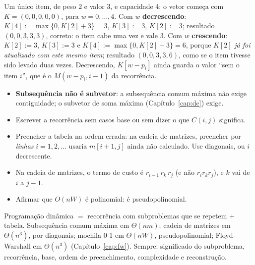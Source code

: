 \begin{exemplo}\label{ex:vetorunico}
Um único item, de peso 2 e valor 3, e capacidade 4; o vetor começa com $K=(0,0,0,0,0)$, para $w=0,\dots,4$. Com $w$ \textbf{decrescendo}: $K[4]:=\max\{0,K[2]+3\}=3$, $K[3]:=3$, $K[2]:=3$; resultado $(0,0,3,3,3)$, correto: o item cabe uma vez e vale 3. Com $w$ \textbf{crescendo}: $K[2]:=3$, $K[3]:=3$ e $K[4]:=\max\{0,K[2]+3\}=6$, porque $K[2]$ \emph{já foi atualizado com este mesmo item}; resultado $(0,0,3,3,6)$, como se o item tivesse sido levado duas vezes. Decrescendo, $K[w-p_i]$ ainda guarda o valor ``sem o item $i$'', que é o $M(w-p_i,i-1)$ da recorrência.
\end{exemplo}

\begin{cuidado}
\begin{itemize}
  \item \textbf{Subsequência não é subvetor}: a subsequência comum máxima não exige contiguidade; o subvetor de soma máxima (Capítulo~\ref{cap:dc}) exige.
  \item Escrever a recorrência sem casos base ou sem dizer o que $C(i,j)$ significa.
  \item Preencher a tabela na ordem errada: na cadeia de matrizes, preencher por \emph{linhas} $i=1,2,\dots$ usaria $m[i+1,j]$ ainda não calculado. Use diagonais, ou $i$ decrescente.
  \item Na cadeia de matrizes, o termo de custo é $r_{i-1}\,r_k\,r_j$ (e não $r_i r_k r_j$), e $k$ vai de $i$ a $j-1$.
  \item Afirmar que $O(nW)$ é polinomial: é pseudopolinomial.
\end{itemize}
\end{cuidado}

\begin{chave}
Programação dinâmica $=$ recorrência com subproblemas que se repetem $+$ tabela. Subsequência comum máxima em $\Theta(nm)$; cadeia de matrizes em $\Theta(n^3)$, por diagonais; mochila 0-1 em $\Theta(nW)$, pseudopolinomial; Floyd-Warshall em $\Theta(n^3)$ (Capítulo~\ref{cap:fw}). Sempre: significado do subproblema, recorrência, base, ordem de preenchimento, complexidade e reconstrução.
\end{chave}

